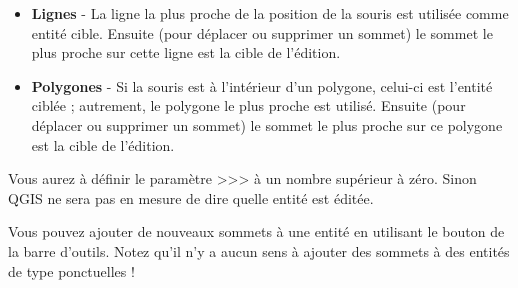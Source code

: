 \begin{itemize}
\begin{itemize}
\item \textbf{Lignes}    - La ligne la plus proche de la position de la souris est utilisée comme entité cible. Ensuite (pour déplacer ou supprimer un sommet) le sommet le plus proche sur cette ligne est la cible de l'édition.
\item \textbf{Polygones} - Si la souris est à l'intérieur d'un polygone, celui-ci est l'entité ciblée ; autrement, le polygone le plus proche est utilisé. Ensuite (pour déplacer ou supprimer un sommet) le sommet le plus proche sur ce polygone est la cible de l'édition.
\end{itemize}

Vous aurez à définir le paramètre >>> à un nombre supérieur à zéro. Sinon QGIS ne sera pas en mesure de dire quelle entité est éditée.

Vous pouvez ajouter de nouveaux sommets à une entité en utilisant le bouton  de la barre d'outils. Notez qu'il n'y a aucun sens à ajouter des sommets à des entités de type ponctuelles !



\end{itemize}
